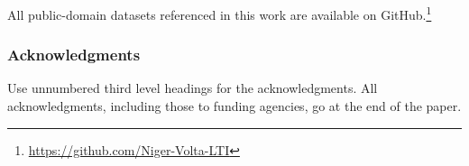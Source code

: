 \documentclass{article} %
\begin{document}
All public-domain datasets referenced in this work are available on GitHub.\footnote{\url{https://github.com/Niger-Volta-LTI}}

\subsubsection*{Acknowledgments}
Use unnumbered third level headings for the acknowledgments. All
acknowledgments, including those to funding agencies, go at the end of the paper.



\end{document}
